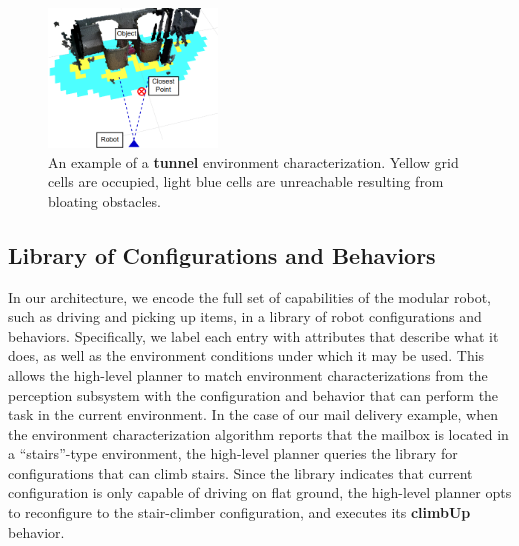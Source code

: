 \documentclass[journal]{IEEEtran}
\begin{document}
%
\begin{figure}
\begin{center}
\includegraphics[width=0.4\textwidth]{images/characterization.png}
\caption{An example of a \textbf{tunnel} environment characterization. Yellow grid cells are occupied, light blue cells are unreachable resulting from bloating obstacles.}
\label{fig:characterization}
\end{center}
\vspace{-2em}
\end{figure}

\subsection{Library of Configurations and Behaviors}
\label{sec:configuration-specifics}
%
In our architecture, we encode the full set of capabilities of the modular robot, such as driving and picking up items, in a library of robot configurations and behaviors.
Specifically, we label each entry with attributes that describe what it does, as well as the environment conditions under which it may be used. 
This allows the high-level planner to match environment characterizations from the perception subsystem with the configuration and behavior that can perform the task in the current environment. 
In the case of our mail delivery example, when the environment characterization algorithm reports that the mailbox is located in a ``stairs''-type environment, the high-level planner queries the library for configurations that can climb stairs.  
Since the library indicates that current configuration is only capable of driving on flat ground, the high-level planner opts to reconfigure to the stair-climber configuration, and executes its \textbf{climbUp} behavior.
\end{document}
